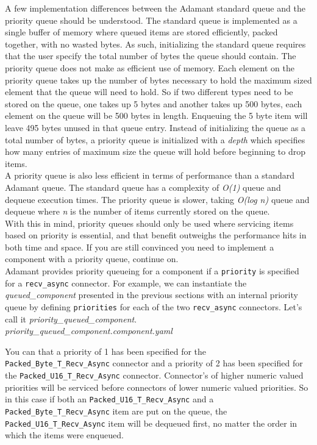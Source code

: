 A few implementation differences between the Adamant standard queue and the priority queue should be understood. The standard queue is implemented as a single buffer of memory where queued items are stored efficiently, packed together, with no wasted bytes. As such, initializing the standard queue requires that the user specify the total number of bytes the queue should contain. The priority queue does not make as efficient use of memory. Each element on the priority queue takes up the number of bytes necessary to hold the maximum sized element that the queue will need to hold. So if two different types need to be stored on the queue, one takes up 5 bytes and another takes up 500 bytes, each element on the queue will be 500 bytes in length. Enqueuing the 5 byte item will leave 495 bytes unused in that queue entry. Instead of initializing the queue as a total number of bytes, a priority queue is initialized with a \textit{depth} which specifies how many entries of maximum size the queue will hold before beginning to drop items. \\

A priority queue is also less efficient in terms of performance than a standard Adamant queue. The standard queue has a complexity of \textit{O(1)} queue and dequeue execution times. The priority queue is slower, taking \textit{O(log n)} queue and dequeue where \textit{n} is the number of items currently stored on the queue. \\

With this in mind, priority queues should only be used where servicing items based on priority is essential, and that benefit outweighs the performance hits in both time and space. If you are still convinced you need to implement a component with a priority queue, continue on. \\

Adamant provides priority queueing for a component if a \texttt{priority} is specified for a \texttt{recv\_async} connector. For example, we can instantiate the \textit{queued\_component} presented in the previous sections with an internal priority queue by defining \texttt{priorities} for each of the two \texttt{recv\_async} connectors. Let's call it \textit{priority\_queued\_component}. \\

\textit{priority\_queued\_component.component.yaml}

You can that a priority of 1 has been specified for the \texttt{Packed\_Byte\_T\_Recv\_Async} connector and a priority of 2 has been specified for the \texttt{Packed\_U16\_T\_Recv\_Async} connector. Connector's of higher numeric valued priorities will be serviced before connectors of lower numeric valued priorities. So in this case if both an \texttt{Packed\_U16\_T\_Recv\_Async} and a \texttt{Packed\_Byte\_T\_Recv\_Async} item are put on the queue, the \texttt{Packed\_U16\_T\_Recv\_Async} item will be dequeued first, no matter the order in which the items were enqueued. \\

